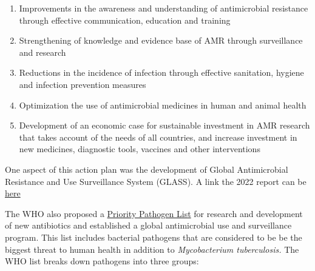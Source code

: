\documentclass[
  letterpaper,
  DIV=11,
  numbers=noendperiod]{scrreprt}
\providecommand{\tightlist}{%
  \setlength{\itemsep}{0pt}\setlength{\parskip}{0pt}}\usepackage{longtable,booktabs,array}
\begin{document}
\begin{enumerate}
\def\labelenumi{\arabic{enumi}.}
\tightlist
\item
  Improvements in the awareness and understanding of antimicrobial
  resistance through effective communication, education and training
\item
  Strengthening of knowledge and evidence base of AMR through
  surveillance and research
\item
  Reductions in the incidence of infection through effective sanitation,
  hygiene and infection prevention measures
\item
  Optimization the use of antimicrobial medicines in human and animal
  health
\item
  Development of an economic case for sustainable investment in AMR
  research that takes account of the needs of all countries, and
  increase investment in new medicines, diagnostic tools, vaccines and
  other interventions
\end{enumerate}

One aspect of this action plan was the development of Global
Antimicrobial Resistance and Use Surveillance System (GLASS). A link the
2022 report can be \href{glass2022.pdf}{here}

The WHO also proposed a
\href{https://www.who.int/medicines/publications/WHO-PPL-Short_Summary_25Feb-ET_NM_WHO.pdf}{Priority
Pathogen List} for research and development of new antibiotics and
established a global antimicrobial use and surveillance program. This
list includes bacterial pathogens that are considered to be be the
biggest threat to human health in addition to \emph{Mycobacterium
tuberculosis.} The WHO list breaks down pathogens into three groups:
\end{document}
